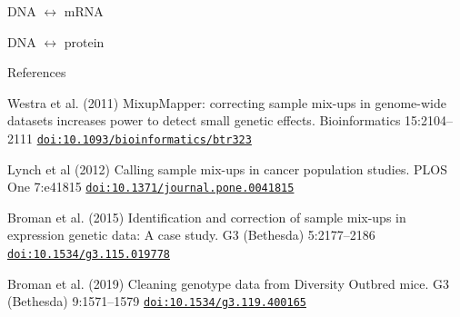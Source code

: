 \documentclass[12pt,t,aspectratio=169]{beamer}
\begin{document}
{

\begin{frame}[c]{}

\centering
\LARGE
\color{revforeground}

DNA $\leftrightarrow$ mRNA

\note{
}

\end{frame}
}







{

\begin{frame}[c]{}

\centering
\LARGE
\color{revforeground}

DNA $\leftrightarrow$ protein

\note{
}

\end{frame}
}













\begin{frame}[c]{References}

  \bbi

  \item Westra et al. (2011) MixupMapper: correcting sample mix-ups in
    genome-wide datasets increases power to detect small genetic
    effects. Bioinformatics 15:2104--2111
    \href{https://doi.org/10.1093/bioinformatics/btr323}{\tt doi:10.1093/bioinformatics/btr323}

  \item Lynch et al (2012) Calling sample mix-ups in cancer population
    studies. PLOS One 7:e41815
    \href{https://doi.org/10.1371/journal.pone.0041815}{\tt doi:10.1371/journal.pone.0041815}

  \item Broman et al. (2015) Identification and correction of sample
    mix-ups in expression genetic data: A case study. G3 (Bethesda)
    5:2177--2186
    \href{https://doi.org/10.1534/g3.115.019778}{\tt doi:10.1534/g3.115.019778}

  \item Broman et al. (2019) Cleaning genotype data from Diversity
    Outbred mice. G3 (Bethesda) 9:1571--1579
    \href{https://doi.org/10.1534/g3.119.400165}{\tt doi:10.1534/g3.119.400165}

  \ei


\end{frame}
\end{document}
